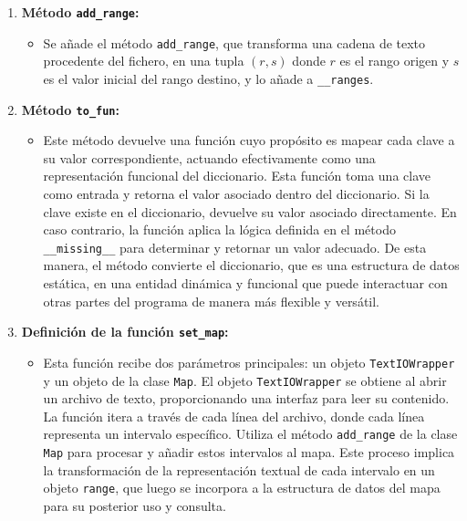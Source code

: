 \documentclass[a4paper,12pt]{article}
\begin{document}
\begin{enumerate}
    \item \textbf{Método \texttt{add\_range}:}
    \begin{itemize}
        \item Se añade el método \lstinline{add_range}, que transforma una cadena de texto procedente del fichero, en una tupla $(r,s)$ donde $r$ es el rango origen y $s$ es el valor inicial del rango destino, y lo añade a \lstinline{__ranges}.
    \end{itemize}
    \item \textbf{Método \texttt{to\_fun}:}
    \begin{itemize}
        \item Este método devuelve una función cuyo propósito es mapear cada clave a su valor correspondiente, actuando efectivamente como una representación funcional del diccionario. Esta función toma una clave como entrada y retorna el valor asociado dentro del diccionario. Si la clave existe en el diccionario, devuelve su valor asociado directamente. En caso contrario, la función aplica la lógica definida en el método \lstinline{__missing__} para determinar y retornar un valor adecuado. De esta manera, el método convierte el diccionario, que es una estructura de datos estática, en una entidad dinámica y funcional que puede interactuar con otras partes del programa de manera más flexible y versátil.
    \end{itemize}
    
    
    \item \textbf{Definición de la función \texttt{set\_map}:}
    \begin{itemize}
        \item Esta función recibe dos parámetros principales: un objeto \lstinline{TextIOWrapper} y un objeto de la clase \lstinline{Map}. El objeto \lstinline{TextIOWrapper} se obtiene al abrir un archivo de texto, proporcionando una interfaz para leer su contenido. La función itera a través de cada línea del archivo, donde cada línea representa un intervalo específico. Utiliza el método \lstinline{add_range} de la clase \lstinline{Map} para procesar y añadir estos intervalos al mapa. Este proceso implica la transformación de la representación textual de cada intervalo en un objeto \lstinline{range}, que luego se incorpora a la estructura de datos del mapa para su posterior uso y consulta.
    \end{itemize}
    

\end{enumerate}
\end{document}
